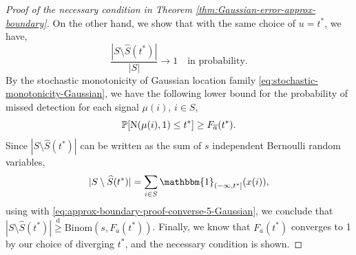 \begin{proof}[Proof of the necessary condition in Theorem \ref{thm:Gaussian-error-approx-boundary}]
On the other hand, we show that with the same choice of $u = t^*$, we have,
\begin{equation} \label{eq:approx-boundary-proof-converse-4-Gaussian}
    \frac{|{S}\setminus\widehat{S}(t^*)|}{|{S}|}\to 1 \quad \text{in probability}.
\end{equation}
By the stochastic monotonicity of Gaussian location family \eqref{eq:stochastic-monotonicity-Gaussian}, we have the following lower bound for the probability of missed detection for each signal $\mu(i)$, $i\in S$, 
\begin{equation} \label{eq:approx-boundary-proof-converse-5-Gaussian}
    \P[\mathrm{N}(\mu(i), 1) \le t^*] \ge F_{\overline{a}}(t^*).
\end{equation}
Since $|{S}\setminus\widehat{S}(t^*)|$ can be written as the sum of $s$ independent Bernoulli random variables,
\begin{equation*}
    |{S}\setminus\widehat{S}(t^*)| = \sum_{i\in S} \mathbbm{1}_{(-\infty, t^*]}(x(i)),
\end{equation*}
using with \eqref{eq:approx-boundary-proof-converse-5-Gaussian}, we conclude that $|{S}\setminus\widehat{S}(t^*)| \stackrel{\mathrm{d}}{\ge} \text{Binom}(s, {F_{\overline{a}}}(t^*))$.
Finally, we know that ${F_{\overline{a}}}(t^*)$ converges to 1 by our choice of diverging $t^*$, and the necessary condition is shown.
\end{proof}


